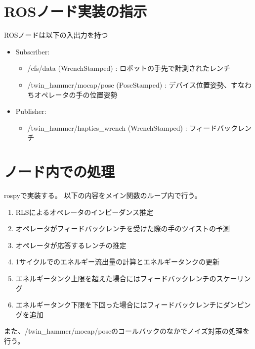 \documentclass[uplatex]{jsarticle}
\begin{document}
\section{ROSノード実装の指示}
ROSノードは以下の入出力を持つ
\begin{itemize}
\item Subscriber:
  \begin{itemize}
    \item /cfs/data (WrenchStamped) : ロボットの手先で計測されたレンチ
    \item /twin\_hammer/mocap/pose (PoseStamped) : デバイス位置姿勢、すなわちオペレータの手の位置姿勢
  \end{itemize}
\item Publisher:
  \begin{itemize}
    \item /twin\_hammer/haptics\_wrench (WrenchStamped) : フィードバックレンチ
  \end{itemize}
\end{itemize}


\section{ノード内での処理}
rospyで実装する。
以下の内容をメイン関数のループ内で行う。
\begin{enumerate}
  \item RLSによるオペレータのインピーダンス推定
  \item オペレータがフィードバックレンチを受けた際の手のツイストの予測
  \item オペレータが応答するレンチの推定
  \item 1サイクルでのエネルギー流出量の計算とエネルギータンクの更新
  \item エネルギータンク上限を超えた場合にはフィードバックレンチのスケーリング
  \item エネルギータンク下限を下回った場合にはフィードバックレンチにダンピングを追加
\end{enumerate}
また、/twin\_hammer/mocap/poseのコールバックのなかでノイズ対策の処理を行う。
\end{document}
